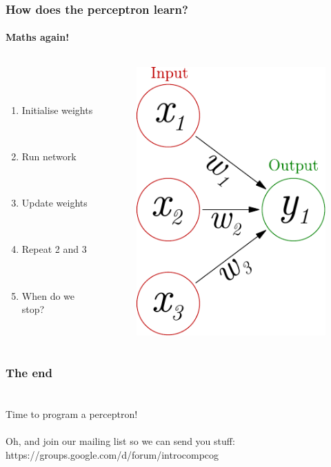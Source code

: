 \documentclass{beamer}
\newcommand{\figheight}{0.72\textheight}
\begin{document}
\begin{frame}
\frametitle{How does the perceptron learn?}
\framesubtitle{Maths again!}
  \begin{columns}[T]
    \begin{column}{.45\textwidth} 
        \  \\
 \   \\ 
\begin{enumerate}
 \item<1-> Initialise weights
 
 \ \\
 \item<1-> Run network
 
 \ \\
 
 \item<1-> Update weights
 
  \ \\
 
 \item<1-> Repeat 2 and 3
 
 \ \\

 \item<2> When do we stop?
\end{enumerate}


    \end{column}
    \begin{column}{.55\textwidth}
\begin{figure}[t]
 \centering
 \includegraphics[height = \figheight]{./fig/perceptron_maths.pdf}
\end{figure}
    \end{column}
  \end{columns}
\end{frame}




\begin{frame}
\frametitle{The end}
\framesubtitle{}
        \  \\


 \Huge Time to program a perceptron!
 \   \\  \   \\ 
\normalsize Oh, and join our mailing list so we can send you stuff: https://groups.google.com/d/forum/introcompcog

\end{frame}
\end{document}
